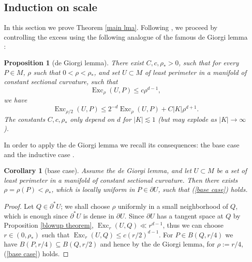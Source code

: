\documentclass[reqno,10pt]{amsart}
\DeclareMathOperator{\Exc}{Exc}
\newtheorem{proposition}[theorem]{Proposition}
\newtheorem{corollary}[theorem]{Corollary}
\theoremstyle{definition}
\numberwithin{equation}{section}
\begin{document}
\subsection{Induction on scale}
In this section we prove Theorem \ref{main lma}.
Following \cite{Miranda66,Giusti77,deGiorgi61}, we proceed by controlling the excess using the following analogue of the famous de Giorgi lemma \cite[Theorem 8.1]{Giusti77}:

\begin{proposition}[de Giorgi lemma]\label{de Giorgi}
There exist $C, c, \rho_* > 0$, such that for every $P \in M$, $\rho$ such that $0 < \rho < \rho_*$, and set $U \subset M$ of least perimeter in a manifold of constant sectional curvature, such that
\begin{equation}\label{base case}
\Exc_\rho(U, P) \leq c\rho^{d - 1},
\end{equation}
we have
\begin{equation}\label{dGL concl}
\Exc_{\rho/2}(U, P) \leq 2^{-d} \Exc_\rho(U, P) + C|K|\rho^{d + 1}.
\end{equation}
The constants $C, c, \rho_*$ only depend on $d$ for $|K| \lesssim 1$ (but may explode as $|K| \to \infty$).
\end{proposition}

In order to apply the de Giorgi lemma we recall its consequences: the base case \cite[pg109]{Giusti77} and the inductive case \cite[Corollary 8.3]{Giusti77}.

\begin{corollary}[base case]
Assume the de Giorgi lemma, and let $U \subset M$ be a set of least perimeter in a manifold of constant sectional curvature.
Then there exists $\rho  = \rho(P) < \rho_*$, which is locally uniform in $P \in \partial U$, such that (\ref{base case}) holds.
\end{corollary}
\begin{proof}
Let $Q \in \partial^* U$; we shall choose $\rho$ uniformly in a small neighborhood of $Q$, which is enough since $\partial^* U$ is dense in $\partial U$.
Since $\partial U$ has a tangent space at $Q$ by Proposition \ref{blowup theorem}, $\Exc_r(U, Q) \ll r^{d - 1}$, thus we can choose $r \in (0, \rho_*)$ such that $\Exc_r(U, Q) \leq c(r/2)^{d - 1}$.
For $P \in B(Q, r/4)$ we have $B(P, r/4) \subseteq B(Q, r/2)$ and hence by the de Giorgi lemma, for $\rho := r/4$, (\ref{base case}) holds.
\end{proof}
\end{document}

